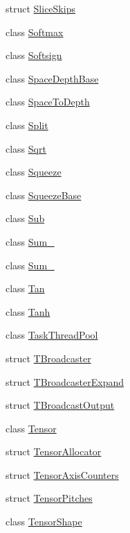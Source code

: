 \begin{DoxyCompactItemize}
struct \mbox{\hyperlink{structonnxruntime_1_1SliceSkips}{Slice\+Skips}}
\item 
class \mbox{\hyperlink{classonnxruntime_1_1Softmax}{Softmax}}
\item 
class \mbox{\hyperlink{classonnxruntime_1_1Softsign}{Softsign}}
\item 
class \mbox{\hyperlink{classonnxruntime_1_1SpaceDepthBase}{Space\+Depth\+Base}}
\item 
class \mbox{\hyperlink{classonnxruntime_1_1SpaceToDepth}{Space\+To\+Depth}}
\item 
class \mbox{\hyperlink{classonnxruntime_1_1Split}{Split}}
\item 
class \mbox{\hyperlink{classonnxruntime_1_1Sqrt}{Sqrt}}
\item 
class \mbox{\hyperlink{classonnxruntime_1_1Squeeze}{Squeeze}}
\item 
class \mbox{\hyperlink{classonnxruntime_1_1SqueezeBase}{Squeeze\+Base}}
\item 
class \mbox{\hyperlink{classonnxruntime_1_1Sub}{Sub}}
\item 
class \mbox{\hyperlink{classonnxruntime_1_1Sum__6}{Sum\+\_}}
\item 
class \mbox{\hyperlink{classonnxruntime_1_1Sum__8}{Sum\+\_}}
\item 
class \mbox{\hyperlink{classonnxruntime_1_1Tan}{Tan}}
\item 
class \mbox{\hyperlink{classonnxruntime_1_1Tanh}{Tanh}}
\item 
class \mbox{\hyperlink{classonnxruntime_1_1TaskThreadPool}{Task\+Thread\+Pool}}
\item 
struct \mbox{\hyperlink{structonnxruntime_1_1TBroadcaster}{T\+Broadcaster}}
\item 
struct \mbox{\hyperlink{structonnxruntime_1_1TBroadcasterExpand}{T\+Broadcaster\+Expand}}
\item 
struct \mbox{\hyperlink{structonnxruntime_1_1TBroadcastOutput}{T\+Broadcast\+Output}}
\item 
class \mbox{\hyperlink{classonnxruntime_1_1Tensor}{Tensor}}
\item 
struct \mbox{\hyperlink{structonnxruntime_1_1TensorAllocator}{Tensor\+Allocator}}
\item 
struct \mbox{\hyperlink{structonnxruntime_1_1TensorAxisCounters}{Tensor\+Axis\+Counters}}
\item 
struct \mbox{\hyperlink{structonnxruntime_1_1TensorPitches}{Tensor\+Pitches}}
\item 
class \mbox{\hyperlink{classonnxruntime_1_1TensorShape}{Tensor\+Shape}}

\end{DoxyCompactItemize}
